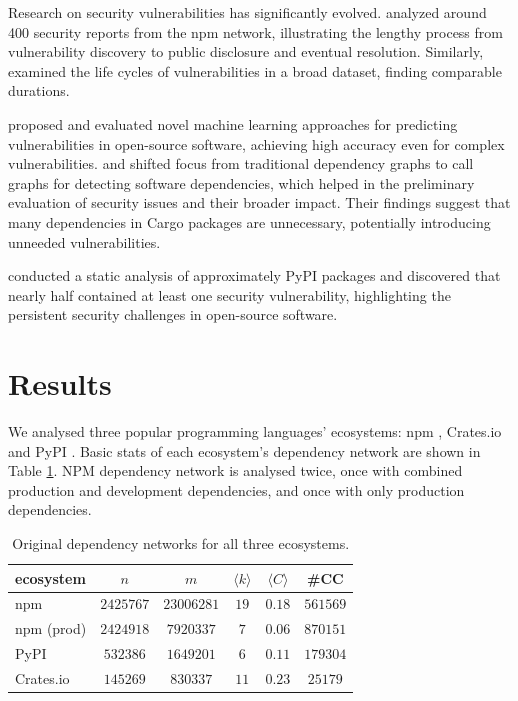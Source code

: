 \documentclass[9pt,twocolumn,twoside]{pnas-report}
\begin{document}
Research on security vulnerabilities has significantly evolved. \cite{decan2018vulnerabilities} analyzed around 400 security reports from the npm network, illustrating the lengthy process from vulnerability discovery to public disclosure and eventual resolution. Similarly, \cite{shahzad2012} examined the life cycles of vulnerabilities in a broad dataset, finding comparable durations.

\cite{HANIF2021103009} proposed and evaluated novel machine learning approaches for predicting vulnerabilities in open-source software, achieving high accuracy even for complex vulnerabilities. \cite{hejderup2018} and \cite{hejderup2022prazi} shifted focus from traditional dependency graphs to call graphs for detecting software dependencies, which helped in the preliminary evaluation of security issues and their broader impact. Their findings suggest that many dependencies in Cargo packages are unnecessary, potentially introducing unneeded vulnerabilities.

\cite{ruohonen2021} conducted a static analysis of approximately  PyPI packages and discovered that nearly half contained at least one security vulnerability, highlighting the persistent security challenges in open-source software.


\section*{Results}
We analysed three popular programming languages' ecosystems: npm , Crates.io  and PyPI .
Basic stats of each ecosystem's dependency network are shown in Table \ref{tab:basic_stats}.
NPM dependency network is analysed twice, once with combined production and development dependencies, and once with only production dependencies.

\begin{table}[h]\centering%
	\caption{Original dependency networks for all three ecosystems.}
	\begin{tabular}{l|ccccc}
		ecosystem  & $n$       & $m$        & $\langle k\rangle$ & $\langle C\rangle$ & \#CC     \\\hline
		npm        & $2425767$ & $23006281$ & $19$               & $0.18$             & $561569$ \\
		npm (prod) & $2424918$ & $7920337$  & $7$                & $0.06$             & $870151$ \\
		PyPI       & $532386$  & $1649201$  & $6$                & $0.11$             & $179304$ \\
		Crates.io  & $145269$  & $830337$   & $11$               & $0.23$             & $25179$  \\
	\end{tabular}
	\label{tab:basic_stats}
\end{table}
\end{document}

